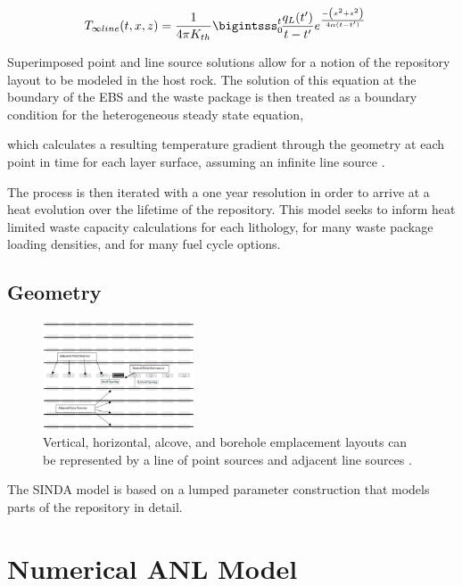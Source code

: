 \documentclass{anstrans}
\begin{document}
\begin{align}
  T_{\infty line}(t,x,z) &= \frac{1}{4\pi K_{th}} 
  \bigintsss_0^t\!\frac{q_L(t')}{t-t'}e^{ \frac{-\left(x^2 + z^2\right)}{4\alpha 
  (t-t')} }
  \label{infline}
\end{align}

Superimposed point and line source solutions allow for a notion of the 
repository layout to be modeled in the host rock. The solution of this equation 
at the boundary of the EBS and the waste package is then treated as a boundary 
condition for the heterogeneous steady state equation, 

which calculates a resulting temperature gradient through the geometry at each 
point in time for each layer surface, assuming an infinite line source 
\cite{hardin_generic_2011}.

The process is then iterated with a one year resolution in order to arrive at a 
heat evolution over  the lifetime of the repository. This model seeks to inform 
heat limited waste capacity calculations for each lithology, for many waste 
package loading densities, and for many fuel cycle options.  


\subsection{Geometry}

\begin{figure}[h!]
  \begin{center}
    \includegraphics[width=0.4\textwidth]{llnlConcept.eps}
  \end{center}
  \caption{Vertical, horizontal, alcove, and borehole emplacement layouts can be 
  represented by a line of point sources and adjacent line sources 
  \cite{sutton_investigations_2011}.}
  \label{fig:llnl}
\end{figure}


The SINDA model is based on a lumped parameter construction that models parts of 
the repository in detail. 
\section{Numerical ANL Model}
\end{document}
